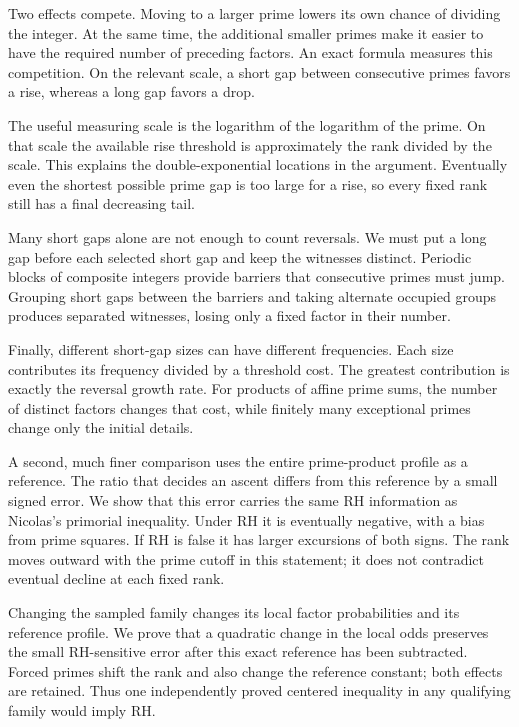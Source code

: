 \documentclass[11pt]{article}
\theoremstyle{definition}
\begin{document}
Two effects compete. Moving to a larger prime lowers its own chance
of dividing the integer. At the same time, the additional smaller
primes make it easier to have the required number of preceding
factors. An exact formula measures this competition. On the relevant
scale, a short gap between consecutive primes favors a rise, whereas
a long gap favors a drop.

The useful measuring scale is the logarithm of the logarithm of the
prime. On that scale the available rise threshold is approximately
the rank divided by the scale. This explains the double-exponential
locations in the argument. Eventually even the shortest possible
prime gap is too large for a rise, so every fixed rank still has a
final decreasing tail.

Many short gaps alone are not enough to count reversals. We must
put a long gap before each selected short gap and keep the witnesses
distinct. Periodic blocks of composite integers provide barriers
that consecutive primes must jump. Grouping short gaps between the
barriers and taking alternate occupied groups produces separated
witnesses, losing only a fixed factor in their number.

Finally, different short-gap sizes can have different frequencies.
Each size contributes its frequency divided by a threshold cost.
The greatest contribution is exactly the reversal growth rate.
For products of affine prime sums, the number of distinct factors
changes that cost, while finitely many exceptional primes change
only the initial details.

A second, much finer comparison uses the entire prime-product profile
as a reference. The ratio that decides an ascent differs from this
reference by a small signed error. We show that this error carries
the same RH information as Nicolas's primorial inequality.
Under RH it is eventually negative, with a bias from prime squares.
If RH is false it has larger excursions of both signs. The rank
moves outward with the prime cutoff in this statement; it does not
contradict eventual decline at each fixed rank.

Changing the sampled family changes its local factor probabilities and
its reference profile. We prove that a quadratic change in the local
odds preserves the small RH-sensitive error after this exact reference
has been subtracted. Forced primes shift the rank and also change the
reference constant; both effects are retained. Thus one independently
proved centered inequality in any qualifying family would imply RH.
\end{document}
